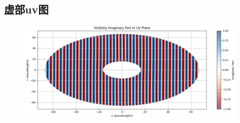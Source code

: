 \documentclass{article}
\begin{document}
\subsection{虚部uv图}
    \begin{figure}[htp]
    \centering
    \includegraphics[width=1\textwidth]{task3/image.png}
    \label{fig:image}
    \end{figure}
\end{document}
